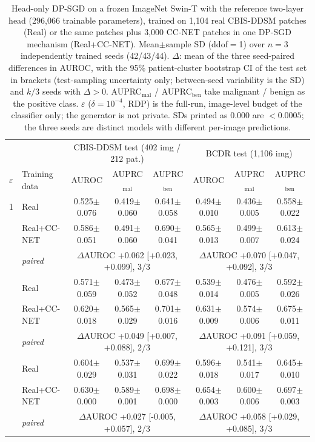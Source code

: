 \begin{table}[t]\centering\scriptsize\setlength{\tabcolsep}{2.2pt}
\caption{Head-only DP-SGD on a frozen ImageNet Swin-T with the reference two-layer head (296{,}066 trainable parameters), trained on 1{,}104 real CBIS-DDSM patches (Real) or the same patches plus 3{,}000 CC-NET patches in one DP-SGD mechanism (Real+CC-NET). Mean$\pm$sample SD (ddof$=$1) over $n=3$ independently trained seeds (42/43/44). $\Delta$: mean of the three seed-paired differences in AUROC, with the 95\% patient-cluster bootstrap CI of the test set in brackets (test-sampling uncertainty only; between-seed variability is the SD) and $k/3$ seeds with $\Delta>0$. AUPRC$_\mathrm{mal}$ / AUPRC$_\mathrm{ben}$ take malignant / benign as the positive class. $\varepsilon$ ($\delta=10^{-4}$, RDP) is the full-run, image-level budget of the classifier only; the generator is not private. SDs printed as 0.000 are $<0.0005$; the three seeds are distinct models with different per-image predictions.}
\label{tab:main_results}
\begin{tabular}{llcccccc}
\toprule
 & & \multicolumn{3}{c}{CBIS-DDSM test (402 img / 212 pat.)} & \multicolumn{3}{c}{BCDR test (1{,}106 img)} \\
\cmidrule(lr){3-5}\cmidrule(lr){6-8}
$\varepsilon$ & Training data & AUROC & AUPRC$_\mathrm{mal}$ & AUPRC$_\mathrm{ben}$ & AUROC & AUPRC$_\mathrm{mal}$ & AUPRC$_\mathrm{ben}$ \\
\midrule
1 & Real & 0.525$\pm$0.076 & 0.419$\pm$0.060 & 0.641$\pm$0.058 & 0.494$\pm$0.010 & 0.436$\pm$0.005 & 0.558$\pm$0.022 \\
 & Real+CC-NET & 0.586$\pm$0.051 & 0.491$\pm$0.060 & 0.690$\pm$0.041 & 0.565$\pm$0.013 & 0.499$\pm$0.007 & 0.613$\pm$0.024 \\
 & \textit{paired} & \multicolumn{3}{c}{$\Delta$AUROC +0.062 [+0.023, +0.099], 3/3} & \multicolumn{3}{c}{$\Delta$AUROC +0.070 [+0.047, +0.092], 3/3} \\
\addlinespace
6 & Real & 0.571$\pm$0.059 & 0.473$\pm$0.052 & 0.677$\pm$0.048 & 0.539$\pm$0.014 & 0.476$\pm$0.005 & 0.592$\pm$0.026 \\
 & Real+CC-NET & 0.620$\pm$0.018 & 0.565$\pm$0.029 & 0.701$\pm$0.016 & 0.631$\pm$0.009 & 0.574$\pm$0.006 & 0.675$\pm$0.011 \\
 & \textit{paired} & \multicolumn{3}{c}{$\Delta$AUROC +0.049 [+0.007, +0.088], 2/3} & \multicolumn{3}{c}{$\Delta$AUROC +0.091 [+0.059, +0.121], 3/3} \\
\addlinespace
60 & Real & 0.604$\pm$0.029 & 0.537$\pm$0.031 & 0.699$\pm$0.022 & 0.596$\pm$0.018 & 0.541$\pm$0.017 & 0.645$\pm$0.010 \\
 & Real+CC-NET & 0.630$\pm$0.000 & 0.589$\pm$0.001 & 0.698$\pm$0.000 & 0.654$\pm$0.003 & 0.600$\pm$0.006 & 0.697$\pm$0.003 \\
 & \textit{paired} & \multicolumn{3}{c}{$\Delta$AUROC +0.027 [-0.005, +0.057], 2/3} & \multicolumn{3}{c}{$\Delta$AUROC +0.058 [+0.029, +0.085], 3/3} \\
\bottomrule
\end{tabular}
\end{table}
